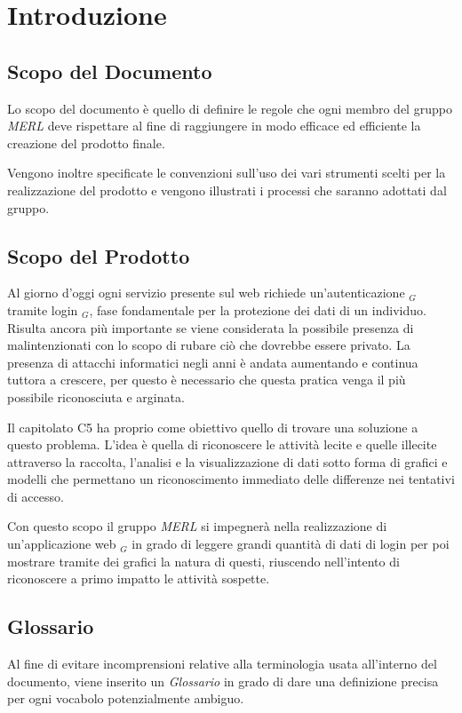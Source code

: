 \chapter{Introduzione}

\section{Scopo del Documento}
Lo scopo del documento è quello di definire le regole che ogni membro del gruppo \textit{MERL} deve rispettare al fine di raggiungere in modo efficace ed efficiente la creazione del prodotto finale.

Vengono inoltre specificate le convenzioni sull'uso dei vari strumenti scelti per la realizzazione del prodotto e vengono illustrati i processi che saranno adottati dal gruppo.

\section{Scopo del Prodotto}
Al giorno d'oggi ogni servizio presente sul web richiede un'autenticazione $_G$ tramite login $_G$, fase fondamentale per la protezione dei dati di un individuo. Risulta ancora più importante se viene considerata la possibile presenza di malintenzionati con lo scopo di rubare ciò che dovrebbe essere privato. La presenza di attacchi informatici negli anni è andata aumentando e continua tuttora a crescere, per questo è necessario che questa pratica venga il più possibile riconosciuta e arginata.

Il capitolato C5 ha proprio come obiettivo quello di trovare una soluzione a questo problema. L'idea è quella di riconoscere le attività lecite e quelle illecite attraverso la raccolta, l'analisi e la visualizzazione di dati sotto forma di grafici e modelli che permettano un riconoscimento immediato delle differenze nei tentativi di accesso.

Con questo scopo il gruppo \textit{MERL} si impegnerà nella realizzazione di un'applicazione web $_G$ in grado di leggere grandi quantità di dati di login per poi mostrare tramite dei grafici la natura di questi, riuscendo nell'intento di riconoscere a primo impatto le attività sospette.

\section{Glossario}
Al fine di evitare incomprensioni relative alla terminologia usata all'interno del documento, viene inserito un \textit{Glossario} in grado di dare una definizione precisa per ogni vocabolo potenzialmente ambiguo.

